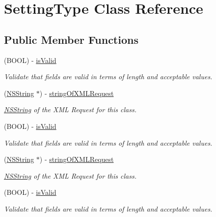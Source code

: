 \hypertarget{interface_setting_type}{
\section{SettingType Class Reference}
\label{interface_setting_type}
}
\subsection*{Public Member Functions}
\begin{DoxyCompactItemize}
\item 
(BOOL) -\/ \hyperlink{interface_setting_type_a61a1dc1ffdd81ce74a6903f7abb65168}{isValid}
\begin{DoxyCompactList}\small\item\em Validate that fields are valid in terms of length and acceptable values. \item\end{DoxyCompactList}\item 
(\hyperlink{class_n_s_string}{NSString} $\ast$) -\/ \hyperlink{interface_setting_type_a73be2186b19c1f2b6002da3893ec9ba5}{stringOfXMLRequest}
\begin{DoxyCompactList}\small\item\em \hyperlink{class_n_s_string}{NSString} of the XML Request for this class. \item\end{DoxyCompactList}\item 
(BOOL) -\/ \hyperlink{interface_setting_type_a61a1dc1ffdd81ce74a6903f7abb65168}{isValid}
\begin{DoxyCompactList}\small\item\em Validate that fields are valid in terms of length and acceptable values. \item\end{DoxyCompactList}\item 
(\hyperlink{class_n_s_string}{NSString} $\ast$) -\/ \hyperlink{interface_setting_type_a73be2186b19c1f2b6002da3893ec9ba5}{stringOfXMLRequest}
\begin{DoxyCompactList}\small\item\em \hyperlink{class_n_s_string}{NSString} of the XML Request for this class. \item\end{DoxyCompactList}\item 
(BOOL) -\/ \hyperlink{interface_setting_type_a61a1dc1ffdd81ce74a6903f7abb65168}{isValid}
\begin{DoxyCompactList}\small\item\em Validate that fields are valid in terms of length and acceptable values. \item\end{DoxyCompactList}\item 

\end{DoxyCompactItemize}
